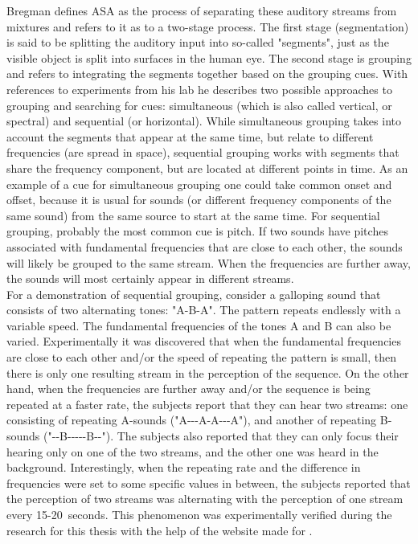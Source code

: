 Bregman defines ASA as the process of separating these auditory streams from mixtures and refers to it as to a two-stage process. The first stage (segmentation) is said to be splitting the auditory input into so-called "segments", just as the visible object is split into surfaces in the human eye. The second stage is grouping and refers to integrating the segments together based on the grouping cues. With references to experiments from his lab he describes two possible approaches to grouping and searching for cues: simultaneous (which is also called vertical, or spectral) and sequential (or horizontal). While simultaneous grouping takes into account the segments that appear at the same time, but relate to different frequencies (are spread in space), sequential grouping works with segments that share the frequency component, but are located at different points in time. As an example of a cue for simultaneous grouping one could take common onset and offset, because it is usual for sounds (or different frequency components of the same sound) from the same source to start at the same time. For sequential grouping, probably the most common cue is pitch. If two sounds have pitches associated with fundamental frequencies that are close to each other, the sounds will likely be grouped to the same stream. When the frequencies are further away, the sounds will most certainly appear in different streams.\\

For a demonstration of sequential grouping, consider a galloping sound that consists of two alternating tones: "A-B-A". The pattern repeats endlessly with a variable speed. The fundamental frequencies of the tones A and B can also be varied. Experimentally \cite{Schnupp2011} it was discovered that when the fundamental frequencies are close to each other and/or the speed of repeating the pattern is small, then there is only one resulting stream in the perception of the sequence. On the other hand, when the frequencies are further away and/or the sequence is being repeated at a faster rate, the subjects report that they can hear two streams: one consisting of repeating A-sounds ("A-{}-{}-A-A-{}-{}-A"), and another of repeating B-sounds ("-{}-B-{}-{}-{}-{}-B-{}-"). The subjects also reported that they can only focus their hearing only on one of the two streams, and the other one was heard in the background. Interestingly, when the repeating rate and the difference in frequencies were set to some specific values in between, the subjects reported that the perception of two streams was alternating with the perception of one stream every 15-20~seconds. This phenomenon was experimentally verified during the research for this thesis with the help of the website made for \cite{Schnupp2011}.\\

